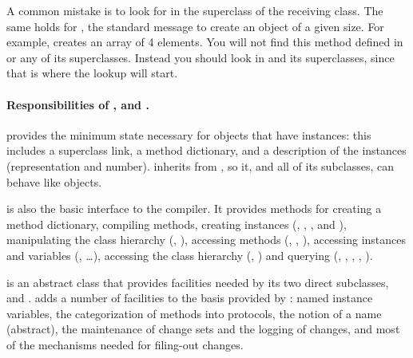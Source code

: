 \documentclass[a4paper,10pt,twoside]{book}
\begin{document}
A common mistake is to look for  in the superclass of the receiving class. The same holds for , the standard message to create an object of a given size.
For example,  creates an array of 4 elements.
You will not find this method defined in  or any of its superclasses.
Instead you should look in  and its superclasses, since that is where the lookup will start.


\paragraph{Responsibilities of ,  and .}
 provides the minimum state necessary for objects that have instances: this includes a superclass link, a method dictionary, and a description of the instances (\ie representation and number).
 inherits from , so it, and all of its subclasses, can behave like objects. 

 is also the basic interface to the compiler.
It provides methods for creating a method dictionary,
compiling methods,
creating instances (\ie {}, , , and ),
manipulating the class hierarchy (\ie {}, ),
accessing methods (\ie {}, , ),
accessing instances and variables (\ie {}, \ldots),
accessing the class hierarchy (\ie {}, )
and querying (\ie {}, , , , ).


 is an abstract class that provides facilities needed by its two direct subclasses,  and .
 adds a number of facilities to the basis provided by :
named instance variables,
the categorization of methods into protocols,
the notion of a name (abstract),
the maintenance of change sets and the logging of changes, and
most of the mechanisms needed for filing-out changes.
\end{document}
